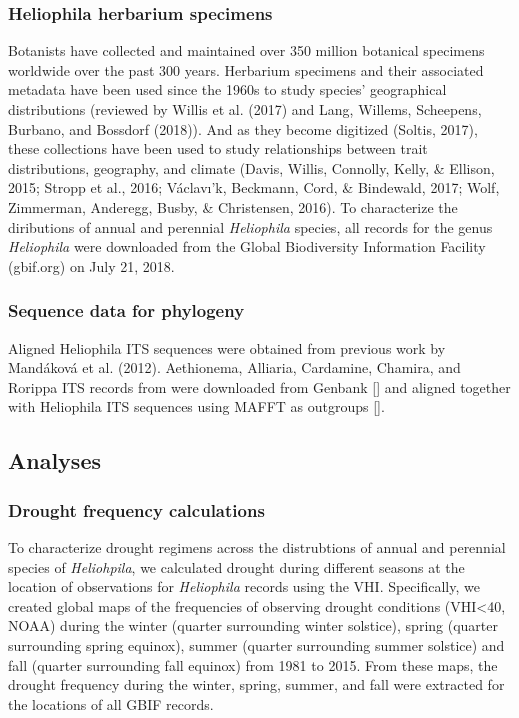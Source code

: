 \documentclass[man,floatsintext]{apa6}
\theoremstyle{definition}
\theoremstyle{definition}
\theoremstyle{definition}
\theoremstyle{remark}
\begin{document}
\hypertarget{heliophila-herbarium-specimens}{%
\subsubsection{Heliophila herbarium
specimens}\label{heliophila-herbarium-specimens}}

Botanists have collected and maintained over 350 million botanical
specimens worldwide over the past 300 years. Herbarium specimens and
their associated metadata have been used since the 1960s to study
species' geographical distributions (reviewed by Willis et al. (2017)
and Lang, Willems, Scheepens, Burbano, and Bossdorf (2018)). And as they
become digitized (Soltis, 2017), these collections have been used to
study relationships between trait distributions, geography, and climate
(Davis, Willis, Connolly, Kelly, \& Ellison, 2015; Stropp et al., 2016;
Václavı'k, Beckmann, Cord, \& Bindewald, 2017; Wolf, Zimmerman,
Anderegg, Busby, \& Christensen, 2016). To characterize the diributions
of annual and perennial \emph{Heliophila} species, all records for the
genus \emph{Heliophila} were downloaded from the Global Biodiversity
Information Facility (gbif.org) on July 21, 2018.

\hypertarget{sequence-data-for-phylogeny}{%
\subsubsection{Sequence data for
phylogeny}\label{sequence-data-for-phylogeny}}

Aligned Heliophila ITS sequences were obtained from previous work by
Mandáková et al. (2012). Aethionema, Alliaria, Cardamine, Chamira, and
Rorippa ITS records from were downloaded from Genbank {[}{]} and aligned
together with Heliophila ITS sequences using MAFFT as outgroups {[}{]}.

\hypertarget{analyses}{%
\subsection{Analyses}\label{analyses}}

\hypertarget{drought-frequency-calculations}{%
\subsubsection{Drought frequency
calculations}\label{drought-frequency-calculations}}

To characterize drought regimens across the distrubtions of annual and
perennial species of \emph{Heliohpila}, we calculated drought during
different seasons at the location of observations for \emph{Heliophila}
records using the VHI. Specifically, we created global maps of the
frequencies of observing drought conditions (VHI\textless{}40, NOAA)
during the winter (quarter surrounding winter solstice), spring (quarter
surrounding spring equinox), summer (quarter surrounding summer
solstice) and fall (quarter surrounding fall equinox) from 1981 to 2015.
From these maps, the drought frequency during the winter, spring,
summer, and fall were extracted for the locations of all GBIF records.
\end{document}
